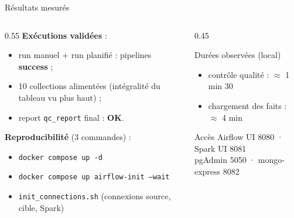 \documentclass[10pt]{beamer}
\begin{document}
\begin{frame}{Résultats mesurés}
  \begin{columns}
    \begin{column}{0.55\textwidth}
      \textbf{Exécutions validées} :
      \begin{itemize}
        \item run manuel + run planifié : pipelines \textbf{success} ;
        \item 10 collections alimentées (intégralité du tableau vu plus haut) ;
        \item report \texttt{qc\_report} final : \textbf{OK}.
      \end{itemize}
      \textbf{Reproducibilité} (3 commandes) :
      \begin{itemize}
        \item \texttt{docker compose up -d}
        \item \texttt{docker compose up airflow-init --wait}
        \item \texttt{init\_connections.sh} (connexions source, cible, Spark)
      \end{itemize}
    \end{column}
    \begin{column}{0.45\textwidth}
      \begin{block}{Durées observées (local)}
        \begin{itemize}
          \item contrôle qualité : $\approx$ 1 min 30
          \item chargement des faits : $\approx$ 4 min
        \end{itemize}
      \end{block}
      \begin{block}{Accès}
        Airflow UI 8080 · Spark UI 8081\\
        pgAdmin 5050 · mongo-express 8082
      \end{block}
    \end{column}
  \end{columns}
\end{frame}
\end{document}

